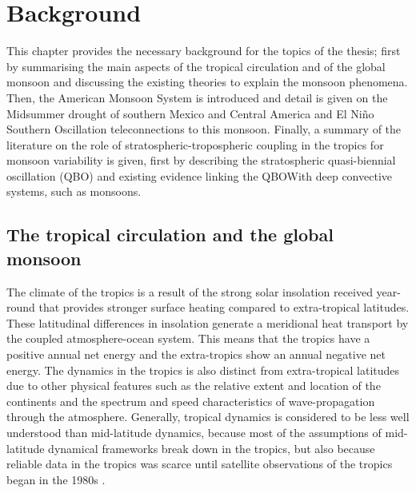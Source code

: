 

\chapter{\label{ch:2-litreview}Background}


 This chapter provides the necessary background for the topics of the thesis; first by summarising the main aspects of the tropical circulation and of the global monsoon and discussing the existing theories to explain the monsoon phenomena. Then, the American Monsoon System is introduced and detail is given on the Midsummer drought of southern Mexico and Central America and El Niño Southern Oscillation teleconnections to this monsoon. Finally, a summary of the literature on the role of stratospheric-tropospheric coupling in the tropics for monsoon variability is given, first by describing the stratospheric quasi-biennial oscillation (QBO) and existing evidence linking the QBOWith deep convective systems, such as monsoons. %
\section{The tropical circulation and the global monsoon}\label{sq:bk_tropics}

The climate of the tropics is a result of the strong solar insolation received year-round that provides stronger surface heating compared to extra-tropical latitudes. These latitudinal differences in insolation generate a meridional heat transport by the coupled atmosphere-ocean system. This means that the tropics have a positive annual net energy and the extra-tropics show an annual negative net energy. 
The dynamics in the tropics is also distinct from extra-tropical latitudes due to other physical features such as the relative extent and location of the continents and the spectrum and speed characteristics of wave-propagation through the atmosphere. 
Generally, tropical dynamics is considered to be less well understood than mid-latitude dynamics, because most of the assumptions of mid-latitude dynamical frameworks break down in the tropics, but also because reliable data in the tropics was scarce until satellite observations of the tropics began in the 1980s \citep{emanuel2007quasi,webster2020dynamics}.


